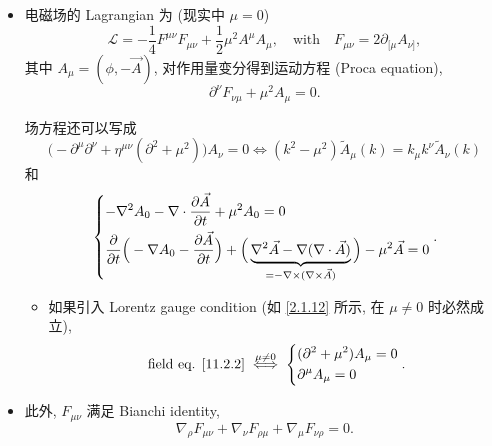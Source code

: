 \begin{itemize}
	\item 电磁场的 Lagrangian 为 (现实中 $\mu = 0$)
	\begin{equation} \label{11.2.1}
		\mathcal{L} = - \frac{1}{4} F^{\mu \nu} F_{\mu \nu} + \frac{1}{2} \mu^2 A^\mu A_\mu, \quad \text{with} \quad F_{\mu \nu} = 2 \partial_{[\mu} A_{\nu]},
	\end{equation}
	其中 $A_\mu = (\phi, - \vec{A})$, 对作用量变分得到运动方程 (Proca equation),
	\begin{equation} \label{11.2.2}
		\partial^\nu F_{\nu \mu} + \mu^2 A_\mu = 0.
	\end{equation}
	
	\begin{tcolorbox}[title=calculation:]
		场方程还可以写成
		\begin{equation}
			\Big( - \partial^\mu \partial^\nu + \eta^{\mu \nu} (\partial^2 + \mu^2) \Big) A_\nu = 0 \iff (k^2 - \mu^2) \tilde{A}_\mu(k) = k_\mu k^\nu \tilde{A}_\nu(k)
		\end{equation}
		和
		\begin{equation}
			\begin{dcases}
				- \nabla^2 A_0 - \nabla \cdot \frac{\partial \vec{A}}{\partial t} + \mu^2 A_0 = 0 \\
				\frac{\partial}{\partial t} \Big( - \nabla A_0 - \frac{\partial \vec{A}}{\partial t} \Big) + \Big( \underbrace{\nabla^2 \vec{A} - \nabla (\nabla \cdot \vec{A})}_{= - \nabla \times (\nabla \times \vec{A})} \Big) - \mu^2 \vec{A} = 0
			\end{dcases}.
		\end{equation}
	\end{tcolorbox}
	
	\begin{itemize}
		\item 如果引入 Lorentz gauge condition (如 \eqref{2.1.12} 所示, 在 $\mu \neq 0$ 时必然成立),
		\begin{equation}
			\text{field eq. \eqref{11.2.2}} \overset{\mu \neq 0}{\iff} \begin{dcases}
				(\partial^2 + \mu^2) A_\mu = 0 \\
				\partial^\mu A_\mu = 0
			\end{dcases}.
		\end{equation}
	\end{itemize}
	
	\item 此外, $F_{\mu \nu}$ 满足 Bianchi identity,
	\begin{equation} \label{11.2.4}
		\nabla_\rho F_{\mu \nu} + \nabla_\nu F_{\rho \mu} + \nabla_\mu F_{\nu \rho} = 0.
	\end{equation}
	

\end{itemize}
